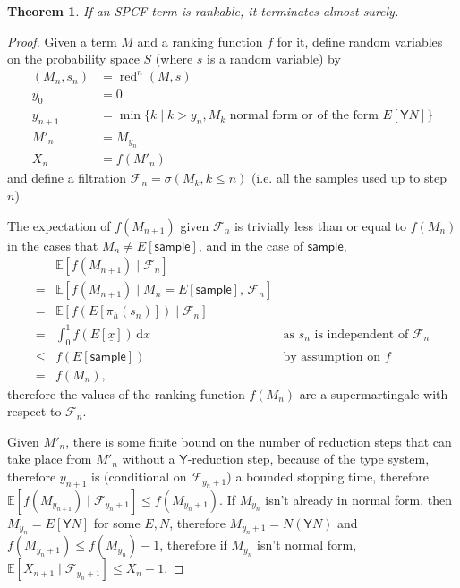 \documentclass{article}
\newcommand{\tY}{\textsf{Y}}
\newcommand{\tsample}{\textsf{sample}}
\DeclareMathOperator{\red}{red}
\newtheorem{theorem}{Theorem}
\begin{document}
\begin{theorem} \label{rankable implies ast}
  If an SPCF term is rankable, it terminates almost surely.
\end{theorem}
\begin{proof}
Given a term $M$ and a ranking function $f$ for it, define random variables on the probability space $S$ (where $s$ is a random variable) by
\begin{align*}
(M_n,s_n) & = \red^n(M,s) \\
y_0 & = 0 \\
y_{n+1} & = \min \{ k \mid k>y_n, M_k \text{ normal form or of the form } E[\tY N] \}\\
M'_n & = M_{y_n} \\
X_n & = f(M'_n)
\end{align*}
and define a filtration $\mathcal{F}_n = \sigma(M_k, k \leq n)$ (i.e. all the samples used up to step $n$).

The expectation of $f(M_{n+1})$ given $\mathcal{F}_n$ is trivially less than or equal to $f(M_n)$ in the cases that $M_n \neq E[\tsample]$, and in the case of $\tsample$,
\begin{align*}
& \mathbb{E}[f(M_{n+1}) \mid \mathcal{F}_n] \\
= & \mathbb{E}[f(M_{n+1}) \mid M_n = E[\tsample],\, \mathcal{F}_n] \\
= & \mathbb{E}[f(E[\pi_h(s_n)]) \mid \mathcal{F}_n] \\
= & \int_0^1 f(E[\underline x]) \, \mathrm{d} x \qquad & \text{as }s_n\text{ is independent of } \mathcal{F}_n \\
\leq & f(E[\tsample]) \qquad & \text{by assumption on } f \\
= & f(M_n),
\end{align*}
therefore the values of the ranking function $f(M_n)$ are a supermartingale with respect to $\mathcal{F}_n$.

Given $M'_n$, there is some finite bound on the number of reduction steps that can take place from $M'_n$ without a $\tY$-reduction step, because of the type system, therefore $y_{n+1}$ is (conditional on $\mathcal{F}_{y_n+1}$) a bounded stopping time, therefore $\mathbb{E}[f(M_{y_{n+1}}) \mid \mathcal{F}_{y_n+1}] \leq f(M_{y_n+1})$. If $M_{y_n}$ isn't already in normal form, then $M_{y_n} = E[\tY N]$ for some $E, N$, therefore $M_{y_n+1} = N (\tY N)$ and $f(M_{y_n+1}) \leq f(M_{y_n}) - 1$, therefore if $M_{y_n}$ isn't normal form, $\mathbb{E}[X_{n+1} \mid \mathcal{F}_{y_n+1}] \leq X_n - 1$.


\end{proof}
\end{document}
